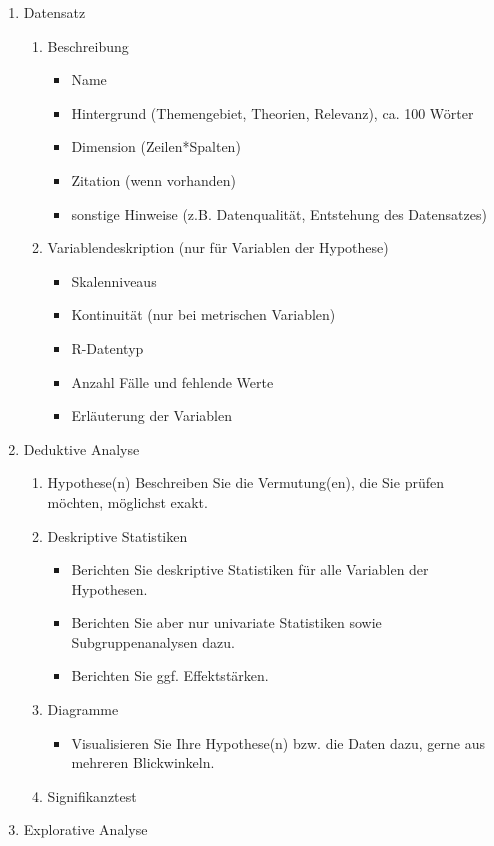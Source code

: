 \documentclass[12pt,ngerman,]{book}
\providecommand{\tightlist}{%
  \setlength{\itemsep}{0pt}\setlength{\parskip}{0pt}}
\begin{document}
\begin{enumerate}
\def\labelenumi{\arabic{enumi}.}
\item
  Datensatz

  \begin{enumerate}
  \def\labelenumii{\arabic{enumii}.}
  \item
    Beschreibung

    \begin{itemize}
    \tightlist
    \item
      Name
    \item
      Hintergrund (Themengebiet, Theorien, Relevanz), ca. 100 Wörter
    \item
      Dimension (Zeilen*Spalten)
    \item
      Zitation (wenn vorhanden)
    \item
      sonstige Hinweise (z.B. Datenqualität, Entstehung des Datensatzes)
    \end{itemize}
  \item
    Variablendeskription (nur für Variablen der Hypothese)

    \begin{itemize}
    \tightlist
    \item
      Skalenniveaus
    \item
      Kontinuität (nur bei metrischen Variablen)
    \item
      R-Datentyp
    \item
      Anzahl Fälle und fehlende Werte
    \item
      Erläuterung der Variablen
    \end{itemize}
  \end{enumerate}
\item
  Deduktive Analyse

  \begin{enumerate}
  \def\labelenumii{\arabic{enumii}.}
  \item
    Hypothese(n) Beschreiben Sie die Vermutung(en), die Sie prüfen
    möchten, möglichst exakt.
  \item
    Deskriptive Statistiken

    \begin{itemize}
    \tightlist
    \item
      Berichten Sie deskriptive Statistiken für alle Variablen der
      Hypothesen.
    \item
      Berichten Sie aber nur univariate Statistiken sowie
      Subgruppenanalysen dazu.
    \item
      Berichten Sie ggf. Effektstärken.
    \end{itemize}
  \item
    Diagramme

    \begin{itemize}
    \tightlist
    \item
      Visualisieren Sie Ihre Hypothese(n) bzw. die Daten dazu, gerne aus
      mehreren Blickwinkeln.
    \end{itemize}
  \item
    Signifikanztest
  \end{enumerate}
\item
  Explorative Analyse
\end{enumerate}
\end{document}
